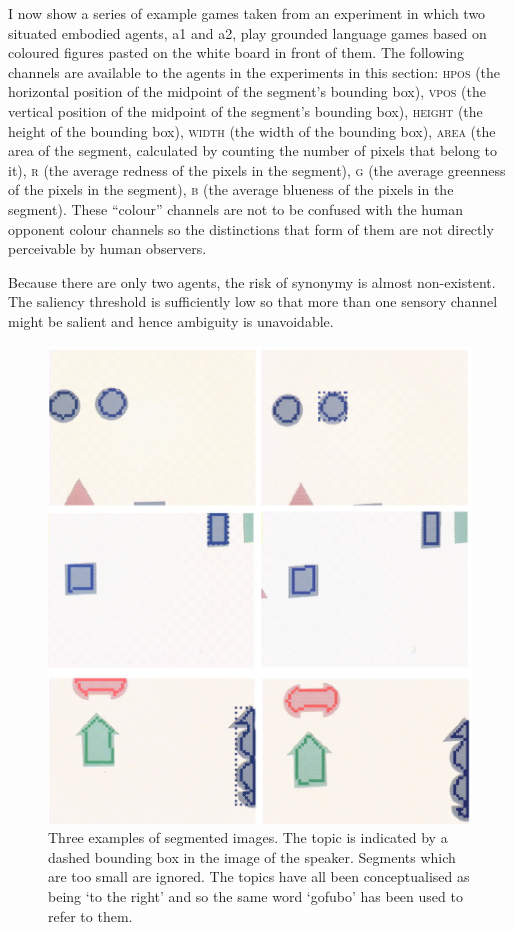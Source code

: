 I now show a series of example games taken from 
an experiment in which two situated embodied agents,
{\bfshape a1} and {\bfshape a2}, play grounded language games based on 
coloured figures pasted on the white board in front
of them. The following channels are available to the agents 
in the experiments in this section: 
\textsc{hpos} (the horizontal position of the midpoint 
of the segment's bounding box), 
\textsc{vpos} (the vertical position of the midpoint of the segment's 
bounding box), \textsc{height} (the height of the bounding box), 
\textsc{width} (the width of the bounding box), \textsc{area}
(the area of the segment, calculated
by counting the number of pixels that belong to it), 
\textsc{r} (the average redness of the pixels in the segment), 
\textsc{g} (the average greenness of the pixels in the segment), 
\textsc{b} (the average blueness of the pixels in the segment). 
These ``colour'' channels are not to be confused with the 
human opponent colour channels so the distinctions 
that form of them are not directly perceivable by 
human observers.

Because there are only two agents, the 
risk of synonymy is almost non-existent. The saliency 
threshold is sufficiently low so that more than one
sensory channel might be salient and hence ambiguity
is unavoidable. 

\begin{figure}
\begin{center}
\includegraphics[width=0.8\columnwidth]{chap7/figs/plate-10.pdf}
\end{center}
\caption{Three examples of segmented images. The 
topic is indicated by a dashed bounding box in the 
image of the speaker. Segments which are too small 
are ignored. The topics have all been conceptualised
as being `to the right' and so the same word 
`gofubo' has been used to refer to them. }
\label{fig:plate-10}
\end{figure}


